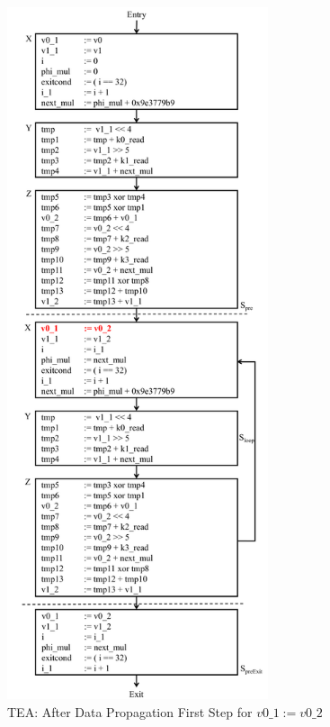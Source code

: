 \begin{figure}[H]
\begin{center}
\includegraphics[height=8in]{fig-proposal/tea-after-data-propagation1}
\caption{TEA: After Data Propagation First Step for $v0\_1 := v0\_2$}
\label{fig:tea-after-data-propagation1}
\end{center}
\end{figure}

